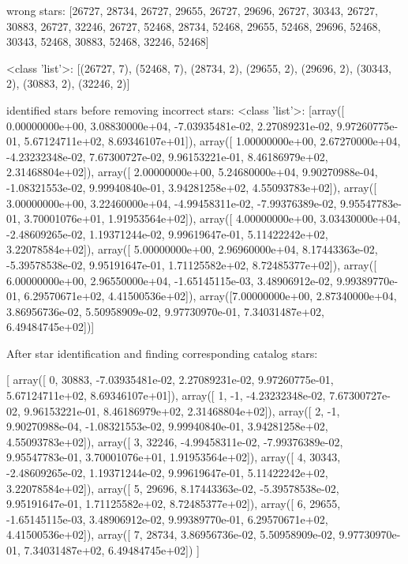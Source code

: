 \documentclass[12pt,a4paper,oneside]{article}
\begin{document}
wrong stars:
[26727, 28734, 26727, 29655, 26727, 29696, 26727, 30343, 26727, 30883, 26727, 32246, 26727, 52468, 28734, 52468, 29655, 52468, 29696, 52468, 30343, 52468, 30883, 52468, 32246, 52468]

<class 'list'>: [(26727, 7), (52468, 7), (28734, 2), (29655, 2), (29696, 2), (30343, 2), (30883, 2), (32246, 2)]

identified stars before removing incorrect stars:
<class 'list'>: [array([ 0.00000000e+00,  3.08830000e+04, -7.03935481e-02,  2.27089231e-02,
        9.97260775e-01,  5.67124711e+02,  8.69346107e+01]), array([ 1.00000000e+00,  2.67270000e+04, -4.23232348e-02,  7.67300727e-02,
        9.96153221e-01,  8.46186979e+02,  2.31468804e+02]), array([ 2.00000000e+00,  5.24680000e+04,  9.90270988e-04, -1.08321553e-02,
        9.99940840e-01,  3.94281258e+02,  4.55093783e+02]), array([ 3.00000000e+00,  3.22460000e+04, -4.99458311e-02, -7.99376389e-02,
        9.95547783e-01,  3.70001076e+01,  1.91953564e+02]), array([ 4.00000000e+00,  3.03430000e+04, -2.48609265e-02,  1.19371244e-02,
        9.99619647e-01,  5.11422242e+02,  3.22078584e+02]), array([ 5.00000000e+00,  2.96960000e+04,  8.17443363e-02, -5.39578538e-02,
        9.95191647e-01,  1.71125582e+02,  8.72485377e+02]), array([ 6.00000000e+00,  2.96550000e+04, -1.65145115e-03,  3.48906912e-02,
        9.99389770e-01,  6.29570671e+02,  4.41500536e+02]), array([7.00000000e+00, 2.87340000e+04, 3.86956736e-02, 5.50958909e-02,
       9.97730970e-01, 7.34031487e+02, 6.49484745e+02])]


After star identification and finding corresponding catalog stars:

[
array([ 0,  30883, -7.03935481e-02,  2.27089231e-02, 9.97260775e-01,  5.67124711e+02,  8.69346107e+01]),
array([ 1, -1, -4.23232348e-02,  7.67300727e-02, 9.96153221e-01,  8.46186979e+02,  2.31468804e+02]), 
array([ 2, -1,  9.90270988e-04, -1.08321553e-02, 9.99940840e-01,  3.94281258e+02,  4.55093783e+02]),
array([ 3,  32246, -4.99458311e-02, -7.99376389e-02, 9.95547783e-01,  3.70001076e+01,  1.91953564e+02]), 
array([ 4,  30343, -2.48609265e-02,  1.19371244e-02, 9.99619647e-01,  5.11422242e+02,  3.22078584e+02]), 
array([ 5,  29696,  8.17443363e-02, -5.39578538e-02, 9.95191647e-01,  1.71125582e+02,  8.72485377e+02]), 
array([ 6,  29655, -1.65145115e-03,  3.48906912e-02, 9.99389770e-01,  6.29570671e+02,  4.41500536e+02]), 
array([ 7,  28734, 3.86956736e-02, 5.50958909e-02, 9.97730970e-01, 7.34031487e+02, 6.49484745e+02])
]
\end{document}
